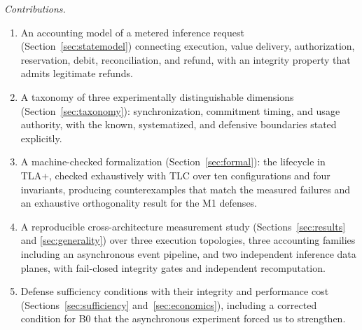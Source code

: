 \documentclass[preprint,3p,authoryear,12pt]{elsarticle}
\begin{document}
\textit{Contributions.}
\begin{enumerate}
\item An accounting model of a metered inference request (Section~\ref{sec:statemodel})
connecting execution, value delivery, authorization, reservation, debit, reconciliation,
and refund, with an integrity property that admits legitimate refunds.
\item A taxonomy of three experimentally distinguishable dimensions
(Section~\ref{sec:taxonomy}): synchronization, commitment timing, and usage authority,
with the known, systematized, and defensive boundaries stated explicitly.
\item A machine-checked formalization (Section~\ref{sec:formal}): the lifecycle in TLA+,
checked exhaustively with TLC over ten configurations and four invariants, producing
counterexamples that match the measured failures and an exhaustive orthogonality result
for the M1 defenses.
\item A reproducible cross-architecture measurement study (Sections~\ref{sec:results} and
\ref{sec:generality}) over three execution topologies, three accounting families
including an asynchronous event pipeline, and two independent inference data planes,
with fail-closed integrity gates and independent recomputation.
\item Defense sufficiency conditions with their integrity and performance cost
(Sections~\ref{sec:sufficiency} and~\ref{sec:economics}), including a corrected condition
for B0 that the asynchronous experiment forced us to strengthen.
\end{enumerate}

\begin{table}[t]
\caption{Adversary directions in LLM inference accounting. Prior work covers the first
three rows; this paper studies the fourth.}
\label{tab:quadrant}
\centering
{}
\end{table}
\end{document}
